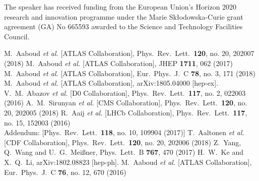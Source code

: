\documentclass[epj]{webofc}
\begin{document}
\begin{acknowledgement}
The speaker has received funding from the European Union’s Horizon 2020 research 
and innovation programme under the Marie Skłodowska-Curie grant agreement (GA) 
No 665593 awarded to the Science and Technology Facilities Council.
\end{acknowledgement}
%
% 
%
%
\begin{thebibliography}{00}
%
%
  M.~Aaboud {\it et al.} [ATLAS Collaboration],
  Phys.\ Rev.\ Lett.\  {\bf 120}, no. 20, 202007 (2018)
  M.~Aaboud {\it et al.} [ATLAS Collaboration],
  JHEP {\bf 1711}, 062 (2017)
  M.~Aaboud {\it et al.} [ATLAS Collaboration],
  Eur.\ Phys.\ J.\ C {\bf 78}, no. 3, 171 (2018)
  M.~Aaboud {\it et al.} [ATLAS Collaboration],
  arXiv:1805.04000 [hep-ex].
  V.~M.~Abazov {\it et al.} [D0 Collaboration],
  Phys.\ Rev.\ Lett.\  {\bf 117}, no. 2, 022003 (2016)
  A.~M.~Sirunyan {\it et al.} [CMS Collaboration],
  Phys.\ Rev.\ Lett.\  {\bf 120}, no. 20, 202005 (2018)
  R.~Aaij {\it et al.} [LHCb Collaboration],
  Phys.\ Rev.\ Lett.\  {\bf 117}, no. 15, 152003 (2016)\\
  Addendum: [Phys.\ Rev.\ Lett.\  {\bf 118}, no. 10, 109904 (2017)]
  T.~Aaltonen {\it et al.} [CDF Collaboration],
  Phys.\ Rev.\ Lett.\  {\bf 120}, no. 20, 202006 (2018)
  Z.~Yang, Q.~Wang and U.~G.~Meißner,
  Phys.\ Lett.\ B {\bf 767}, 470 (2017)
  H.~W.~Ke and X.~Q.~Li,
  arXiv:1802.08823 [hep-ph].
  M.~Aaboud {\it et al.} [ATLAS Collaboration],
  Eur.\ Phys.\ J.\ C {\bf 76}, no. 12, 670 (2016)
\end{thebibliography}
\end{document}
